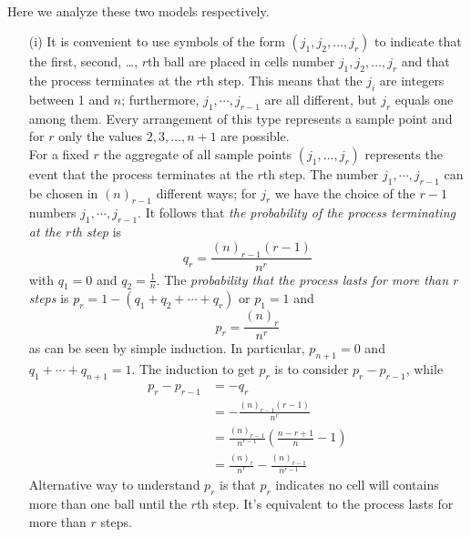 \documentclass{article}
\numberwithin{equation}{subsection}
\begin{document}
			\paragraph{} Here we analyze these two models respectively.
			\begin{enumerate}
			\item[(i)] It is convenient to use symbols of the form $(j_1,j_2,\dots,j_r)$ to indicate that the first, second, \dots, $r$th ball are placed in cells number $j_1,j_2,\dots,j_r$ and that the process terminates at the $r$th step. This means that the $j_i$ are integers between 1 and $n$; furthermore, $j_1,\cdots,j_{r-1}$ are all different, but $j_r$ equals one among them. Every arrangement of this type represents a sample point and for $r$ only the values $2,3,\dots,n+1$ are possible. 
			\medskip \\ For a fixed $r$ the aggregate of all sample points $(j_1,\dots,j_r)$ represents the event that the process terminates at the $r$th step. The number $j_1,\cdots,j_{r-1}$ can be chosen in $(n)_{r-1}$ different ways; for $j_r$ we have the choice of the $r-1$ numbers $j_1,\cdots,j_{r-1}$. It follows that \textit{the probability of the process terminating at the $r$th step} is
			\begin{equation}
				\label{eq:2.7.1}
				q_r=\frac{(n)_{r-1}(r-1)}{n^r}
			\end{equation} with $q_1=0$ and $q_2=\frac{1}{n}$. The \textit{probability that the process lasts for more than $r$ steps} is $p_r=1-(q_1+q_2+\cdots+q_r)$ or $p_1=1$ and 
			\begin{equation}
				\label{eq:2.7.2}
				p_r = \frac{(n)_r}{n^r}
			\end{equation}
			as can be seen by simple induction. In particular, $p_{n+1}=0$ and $q_1+\cdots+q_{n+1}=1$. The induction to get $p_r$ is to consider $p_r-p_{r-1}$, while
			\begin{equation}
			\begin{aligned}
				p_r-p_{r-1} &= -q_r \\ &= -\frac{(n)_{r-1}(r-1)}{n^r} \\ &=\frac{(n)_{r-1}}{n^{r-1}}\left(\frac{n-r+1}{n}-1\right) \\ &= \frac{(n)_{r}}{n^{r}}-\frac{(n)_{r-1}}{n^{r-1}}
			\end{aligned}
			\end{equation}
			Alternative way to understand $p_r$ is that $p_r$ indicates no cell will contains more than one ball until the $r$th step. It's equivalent to the process lasts for more than $r$ steps.

\end{enumerate}
\end{document}
